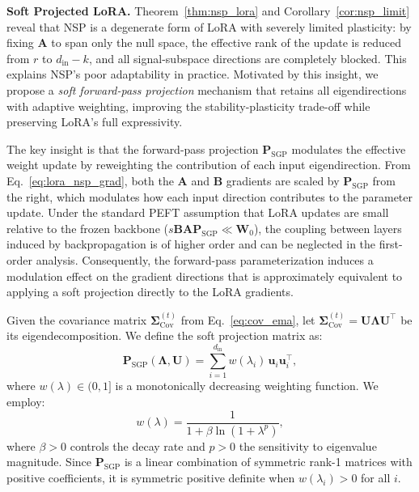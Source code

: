 \documentclass{article}
\begin{document}
\textbf{Soft Projected LoRA.}
Theorem~\ref{thm:nsp_lora} and Corollary~\ref{cor:nsp_limit} reveal that NSP is a degenerate form of LoRA with severely limited plasticity: by fixing $\mathbf{A}$ to span only the null space, the effective rank of the update is reduced from $r$ to $d_{\text{in}} - k$, and all signal-subspace directions are completely blocked. This explains NSP's poor adaptability in practice. Motivated by this insight, we propose a \textit{soft forward-pass projection} mechanism that retains all eigendirections with adaptive weighting, improving the stability-plasticity trade-off while preserving LoRA's full expressivity.

The key insight is that the forward-pass projection $\mathbf{P}_{\text{SGP}}$ modulates the effective weight update by reweighting the contribution of each input eigendirection. From Eq.~\eqref{eq:lora_nsp_grad}, both the $\mathbf{A}$ and $\mathbf{B}$ gradients are scaled by $\mathbf{P}_{\text{SGP}}$ from the right, which modulates how each input direction contributes to the parameter update. Under the standard PEFT assumption that LoRA updates are small relative to the frozen backbone ($s\mathbf{B}\mathbf{A}\mathbf{P}_{\text{SGP}} \ll \mathbf{W}_0$), the coupling between layers induced by backpropagation is of higher order and can be neglected in the first-order analysis. Consequently, the forward-pass parameterization induces a modulation effect on the gradient directions that is approximately equivalent to applying a soft projection directly to the LoRA gradients.

Given the covariance matrix $\mathbf{\Sigma}_{\text{Cov}}^{(t)}$ from Eq.~\eqref{eq:cov_ema}, let $\mathbf{\Sigma}_{\text{Cov}}^{(t)} = \mathbf{U}\mathbf{\Lambda} \mathbf{U}^\top$ be its eigendecomposition. We define the soft projection matrix as:
\begin{equation}
    \mathbf{P}_{\text{SGP}}(\mathbf{\Lambda}, \mathbf{U}) = \sum_{i=1}^{d_{\text{in}}} w(\lambda_i) \, \mathbf{u}_i \mathbf{u}_i^\top,
    \label{eq:psgp}
\end{equation}
where $w(\lambda) \in (0,1]$ is a monotonically decreasing weighting function. We employ:
\begin{equation}
    w(\lambda) = \frac{1}{1 + \beta\ln(1 + \lambda^p)},
    \label{eq:weight_fn}
\end{equation}
where $\beta > 0$ controls the decay rate and $p > 0$ the sensitivity to eigenvalue magnitude. Since $\mathbf{P}_{\text{SGP}}$ is a linear combination of symmetric rank-1 matrices with positive coefficients, it is symmetric positive definite when $w(\lambda_i) > 0$ for all $i$.
\end{document}
